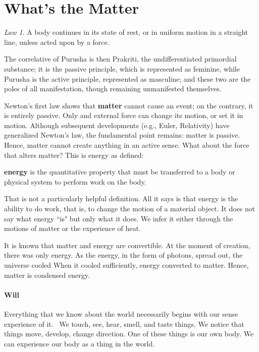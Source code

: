\section{What's the Matter}

\begin{quotex}
\emph{Law 1}. A body continues in its state of rest, or in uniform motion in a straight line, unless acted upon by a force. 

The correlative of Purusha is then Prakriti, the undifferentiated primordial substance; it is the passive principle, which is represented as feminine, while Purusha is the active principle, represented as masculine; and these two are the poles of all manifestation, though remaining unmanifested themselves. 

\end{quotex}
Newton's first law shows that \textbf{matter} cannot cause an event; on the contrary, it is entirely passive. Only and external force can change its motion, or set it in motion. Although subsequent developments (e.g., Euler, Relativity) have generalized Newton's law, the fundamental point remains: matter is passive. Hence, matter cannot create anything in an active sense. What about the force that alters matter? This is energy as defined:

\begin{quotex}
\textbf{energy} is the quantitative property that must be transferred to a body or physical system to perform work on the body. 

\end{quotex}
That is not a particularly helpful definition. All it says is that energy is the ability to do work, that is, to change the motion of a material object. It does not say what energy ``is" but only what it does. We infer it either through the motions of matter or the experience of heat.

It is known that matter and energy are convertible. At the moment of creation, there was only energy. As the energy, in the form of photons, spread out, the universe cooled When it cooled sufficiently, energy converted to matter. Hence, matter is condensed energy.

\paragraph{Will}
Everything that we know about the world necessarily begins with our sense experience of it.  We touch, see, hear, smell, and taste things. We notice that things move, develop, change direction. One of these things is our own body. We can experience our body as a thing in the world.


